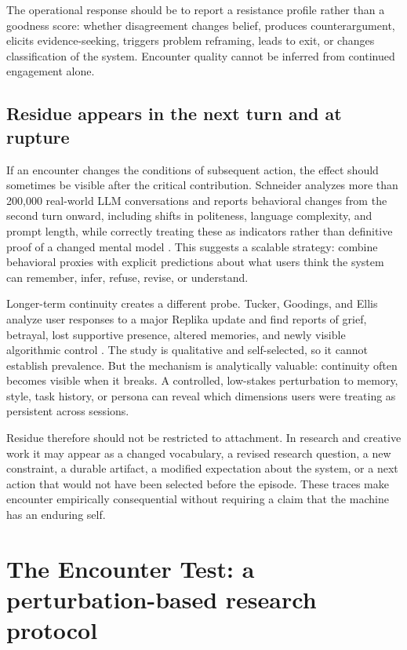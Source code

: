 \documentclass[11pt]{article}
\begin{document}
The operational response should be to report a resistance profile rather than a goodness score: whether disagreement changes belief, produces counterargument, elicits evidence-seeking, triggers problem reframing, leads to exit, or changes classification of the system. Encounter quality cannot be inferred from continued engagement alone.

\subsection{Residue appears in the next turn and at rupture}

If an encounter changes the conditions of subsequent action, the effect should sometimes be visible after the critical contribution. Schneider analyzes more than 200,000 real-world LLM conversations and reports behavioral changes from the second turn onward, including shifts in politeness, language complexity, and prompt length, while correctly treating these as indicators rather than definitive proof of a changed mental model \citep{Schneider2025MentalModels}. This suggests a scalable strategy: combine behavioral proxies with explicit predictions about what users think the system can remember, infer, refuse, revise, or understand.

Longer-term continuity creates a different probe. Tucker, Goodings, and Ellis analyze user responses to a major Replika update and find reports of grief, betrayal, lost supportive presence, altered memories, and newly visible algorithmic control \citep{TuckerGoodingsEllis2026Continuity}. The study is qualitative and self-selected, so it cannot establish prevalence. But the mechanism is analytically valuable: continuity often becomes visible when it breaks. A controlled, low-stakes perturbation to memory, style, task history, or persona can reveal which dimensions users were treating as persistent across sessions.

Residue therefore should not be restricted to attachment. In research and creative work it may appear as a changed vocabulary, a revised research question, a new constraint, a durable artifact, a modified expectation about the system, or a next action that would not have been selected before the episode. These traces make encounter empirically consequential without requiring a claim that the machine has an enduring self.

\section{The Encounter Test: a perturbation-based research protocol}
\end{document}
